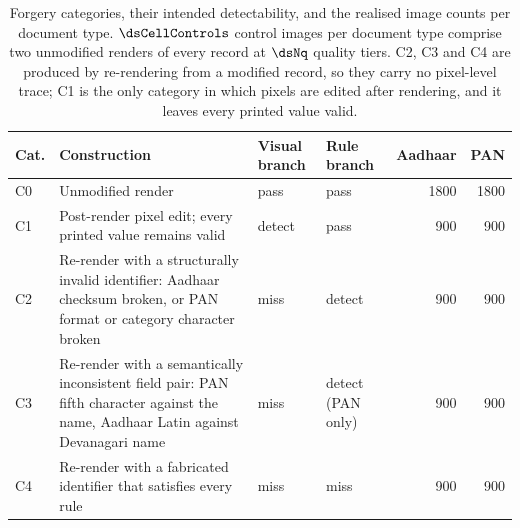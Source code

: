 \begin{table}[t]
\caption{Forgery categories, their intended
detectability, and the realised image counts per document type.
$\dsCellControls$ control images per document type comprise two
unmodified renders of every record at $\dsNq$ quality tiers. C2, C3
and C4 are produced by re-rendering from a modified record, so they
carry no pixel-level trace; C1 is the only category in which pixels
are edited after rendering, and it leaves every printed value valid.}
\label{tab:forgery}
\centering
\footnotesize
\begin{tabular}{@{}l p{7.2cm} l p{2.7cm} r r@{}}
\toprule
Cat. & Construction & Visual branch & Rule branch & Aadhaar & PAN \\
\midrule
C0 & Unmodified render & pass & pass & 1800 & 1800 \\
C1 & Post-render pixel edit; every printed value remains valid & detect & pass & 900 & 900 \\
C2 & Re-render with a structurally invalid identifier: Aadhaar checksum broken, or PAN format or category character broken & miss & detect & 900 & 900 \\
C3 & Re-render with a semantically inconsistent field pair: PAN fifth character against the name, Aadhaar Latin against Devanagari name & miss & detect (PAN only) & 900 & 900 \\
C4 & Re-render with a fabricated identifier that satisfies every rule & miss & miss & 900 & 900 \\
\bottomrule
\end{tabular}
\end{table}
